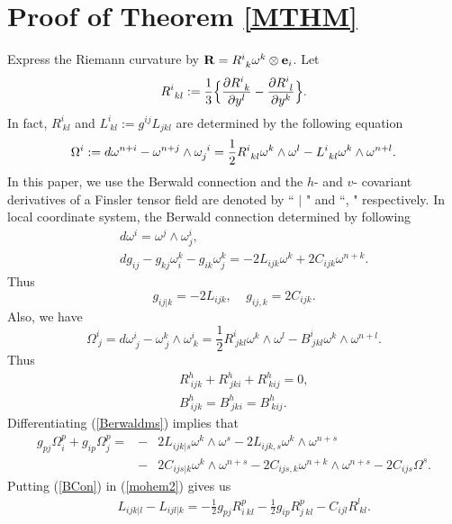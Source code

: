 \documentclass[12pt,a4paper]{article}
\theoremstyle{definition}
\newcommand{\be}{\begin{equation}}
\newcommand{\ee}{\end{equation}}
\numberwithin{equation}{section}
\begin{document}
\section{Proof of Theorem \ref{MTHM}}
Express the Riemann curvature by
${\bf R}= R^i_{\ k} \omega^k \otimes {\bf e}_i$.
Let
\be
R^i_{\ kl}:= {1\over 3} \Big \{\frac{\partial R^i_{\ k}}{\partial y^l} - \frac{\partial R^i_{\ l}}{\partial y^k} \Big \}.\label{Kikl}
\ee
In fact,  $R^i_{\ kl}$ and $L^i_{\ kl}:= g^{ij}L_{jkl}$ are determined by the following equation
\[
\Omega^i := d\omega^{n+i}-\omega^{n+j} \wedge \omega_j^{\ i}
= {1\over 2} R^i_{\  kl}\omega^k \wedge \omega^l - L^i_{\ kl} \omega^k \wedge \omega^{n+l}.
\]
In this paper, we use the Berwald connection  and the $h$- and $v$- covariant derivatives of a Finsler tensor field are denoted by `` $|$ " and ``, " respectively. In local coordinate system, the Berwald connection determined by following
\begin{eqnarray}
&&d\omega^i = \omega^j \wedge \omega^i_j,\\
&&dg_{ij}- g_{kj}\omega^k_i - g_{ik}\omega^k_j = -2L_{ijk}\omega^k + 2C_{ijk}\omega^{n+k}.\label{Berwaldms}
\end{eqnarray}
Thus
\[
g_{ij|k}= -2L_{ijk},   \ \ \ \ \ g_{ij,k}= 2C_{ijk}.
\]
Also, we have
\begin{equation}
\Omega^i_{\ j}=d\omega^i_{\ j}-\omega^k_{\ j}\wedge\omega^i_{\
k}=\frac{1}{2}R^i_{\ jkl}\omega^k\wedge\omega^l-B^i_{\
jkl}\omega^k\wedge\omega^{n+l}.\label{BCon}
  \end{equation}
Thus
\begin{eqnarray}
&&R^h_{\ ijk}+ R^h_{\ jki}+ R^h_{\ kij}=0,\label{xxxzzz}\\
&&B^h_{\ ijk}=B^h_{\ jki}=B^h_{\ kij}.
\end{eqnarray}
Differentiating (\ref{Berwaldms}) implies that
\begin{eqnarray}
\nonumber g_{pj}\Omega^p_i+g_{ip}\Omega^p_j=\!\!\!\!&-&\!\!\!\!\! 2L_{ijk|s}\omega^k\wedge\omega^s-2L_{ijk,s}\omega^k\wedge\omega^{n+s}\\
\!\!\!\!&-&\!\!\!\!\! 2C_{ijs|k}\omega^k\wedge\omega^{n+s}-2C_{ijs,k}\omega^{n+k}\wedge\omega^{n+s}-2C_{ijs}\Omega^s.\label{mohem2}
\end{eqnarray}
Putting (\ref{BCon}) in (\ref{mohem2}) gives us
\begin{eqnarray}
&&L_{ijk|l}-L_{ijl|k}=-\frac{1}{2}g_{pj}R^p_{i\ kl}-\frac{1}{2}g_{ip}R^p_{j\ kl}-C_{ijl}R^l_{\ kl}.\label{xxxyyy}
\end{eqnarray}
\end{document}
